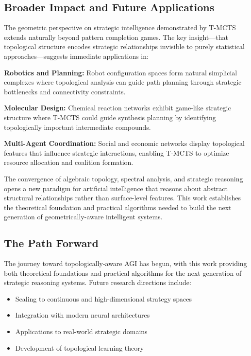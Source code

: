\documentclass{article}
\begin{document}
\subsection{Broader Impact and Future Applications}

The geometric perspective on strategic intelligence demonstrated by T-MCTS extends naturally beyond pattern completion games. The key insight—that topological structure encodes strategic relationships invisible to purely statistical approaches—suggests immediate applications in:

\textbf{Robotics and Planning:} Robot configuration spaces form natural simplicial complexes where topological analysis can guide path planning through strategic bottlenecks and connectivity constraints.

\textbf{Molecular Design:} Chemical reaction networks exhibit game-like strategic structure where T-MCTS could guide synthesis planning by identifying topologically important intermediate compounds.

\textbf{Multi-Agent Coordination:} Social and economic networks display topological features that influence strategic interactions, enabling T-MCTS to optimize resource allocation and coalition formation.

The convergence of algebraic topology, spectral analysis, and strategic reasoning opens a new paradigm for artificial intelligence that reasons about abstract structural relationships rather than surface-level features. This work establishes the theoretical foundation and practical algorithms needed to build the next generation of geometrically-aware intelligent systems.

\subsection{The Path Forward}

The journey toward topologically-aware AGI has begun, with this work providing both theoretical foundations and practical algorithms for the next generation of strategic reasoning systems. Future research directions include:

\begin{itemize}
\item Scaling to continuous and high-dimensional strategy spaces
\item Integration with modern neural architectures
\item Applications to real-world strategic domains
\item Development of topological learning theory
\end{itemize}
\end{document}
